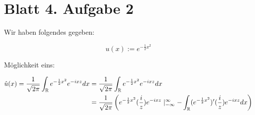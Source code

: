 \documentclass[
 ngerman]{report}
\begin{document}
\section*{Blatt 4. Aufgabe 2}

Wir haben folgendes gegeben: 

$$ u(x) := e^{- \frac {1} {2} x^2}$$

Möglichkeit eins:

$ \begin{aligned}
	\hat{u}(x) = \frac {1} {\sqrt{2\pi}} 
		\int_{\mathbb{R}} e^{- \frac {1} {2} x^2} e^{- ixz} dx 
	&= \frac {1} {\sqrt{2\pi}} \int_{\mathbb{R}} e^{- \frac {1} {2} x^2} e^{- ixz} dx
	\\ 	
	&= \frac {1} {\sqrt{2\pi}} \left( 
		e^{- \frac {1} {2} x^2} (\frac {i}{z}) e^{- ixz} \mid_{-\infty}^{\infty}
		- \int_{\mathbb{R}} (e^{- \frac {1} {2} x^2})' ( \frac {i} {z})e^{- ixz} dx 
		\right)
\end{aligned}$
\end{document}
